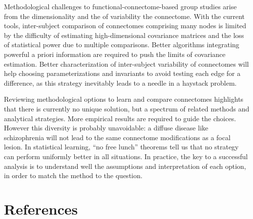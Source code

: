 \documentclass[5p]{elsarticle}
\begin{document}
Methodological challenges to functional-connectome-based group studies
arise from the dimensionality and the of variability the connectome. With
the current tools, inter-subject comparison of connectomes comprising
many nodes is limited by the difficulty of estimating high-dimensional
covariance matrices and the loss of statistical power due to multiple
comparisons. Better algorithms integrating powerful a priori information are required
to push the limits of covariance estimation. Better characterization of
inter-subject variability of connectomes \cite{kelly2012} will help
choosing parameterizations and invariants to avoid testing each edge for
a difference, as this strategy inevitably leads to a needle in a haystack
problem.

Reviewing methodological options to learn and compare connectomes
highlights that there is currently no unique solution, but a spectrum of
related methods and analytical strategies. More empirical results are
required to guide the choices. However this diversity is probably
unavoidable: a diffuse disease like schizophrenia will not lead to the
same connectome modifications as a focal lesion. In statistical learning,
``no free lunch'' theorems \cite{wolpert1996} tell us that no strategy
can perform uniformly better in all situations. In practice, the key to a
successful analysis is to understand well the assumptions and
interpretation of each option, in order to match the method to the
question.

{
\section*{References}
\small
%

 }

\end{document}
